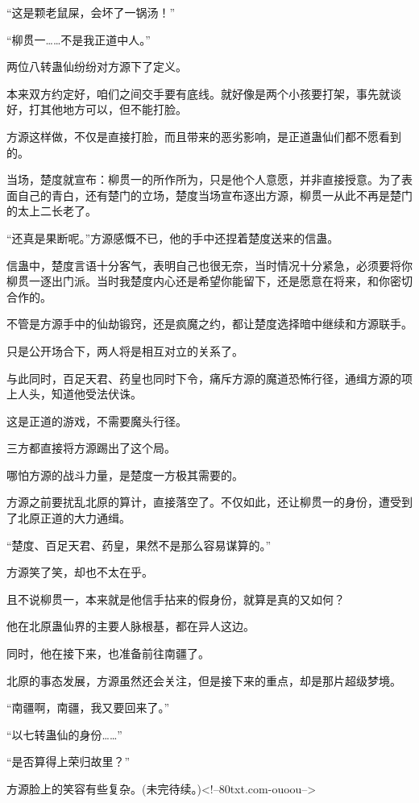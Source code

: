 \begin{this_body}
“这是颗老鼠屎，会坏了一锅汤！”

“柳贯一……不是我正道中人。”

两位八转蛊仙纷纷对方源下了定义。

本来双方约定好，咱们之间交手要有底线。就好像是两个小孩要打架，事先就谈好，打其他地方可以，但不能打脸。

方源这样做，不仅是直接打脸，而且带来的恶劣影响，是正道蛊仙们都不愿看到的。

当场，楚度就宣布：柳贯一的所作所为，只是他个人意愿，并非直接授意。为了表面自己的青白，还有楚门的立场，楚度当场宣布逐出方源，柳贯一从此不再是楚门的太上二长老了。

“还真是果断呢。”方源感慨不已，他的手中还捏着楚度送来的信蛊。

信蛊中，楚度言语十分客气，表明自己也很无奈，当时情况十分紧急，必须要将你柳贯一逐出门派。当时我楚度内心还是希望你能留下，还是愿意在将来，和你密切合作的。

不管是方源手中的仙劫锻窍，还是疯魔之约，都让楚度选择暗中继续和方源联手。

只是公开场合下，两人将是相互对立的关系了。

与此同时，百足天君、药皇也同时下令，痛斥方源的魔道恐怖行径，通缉方源的项上人头，知道他受法伏诛。

这是正道的游戏，不需要魔头行径。

三方都直接将方源踢出了这个局。

哪怕方源的战斗力量，是楚度一方极其需要的。

方源之前要扰乱北原的算计，直接落空了。不仅如此，还让柳贯一的身份，遭受到了北原正道的大力通缉。

“楚度、百足天君、药皇，果然不是那么容易谋算的。”

方源笑了笑，却也不太在乎。

且不说柳贯一，本来就是他信手拈来的假身份，就算是真的又如何？

他在北原蛊仙界的主要人脉根基，都在异人这边。

同时，他在接下来，也准备前往南疆了。

北原的事态发展，方源虽然还会关注，但是接下来的重点，却是那片超级梦境。

“南疆啊，南疆，我又要回来了。”

“以七转蛊仙的身份……”

“是否算得上荣归故里？”

方源脸上的笑容有些复杂。(未完待续。)<!--80txt.com-ouoou-->

\end{this_body}

